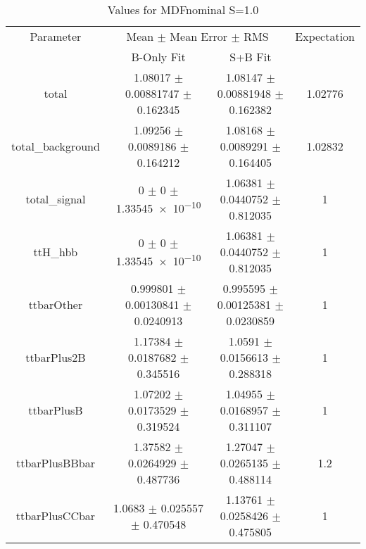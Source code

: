 \begin{table}
\centering
\caption{Values for MDFnominal S=1.0}
\begin{tabular}{cccc}
\toprule
Parameter & \multicolumn{2}{c}{Mean $\pm$ Mean Error $\pm$ RMS} & Expectation\\
 & B-Only Fit & S+B Fit & \\
\midrule
total & \num{1.08017} $\pm$ \num{0.00881747} $\pm$ \num{0.162345} & \num{1.08147} $\pm$ \num{0.00881948} $\pm$ \num{0.162382} & \num{1.02776}\\
total\_background & \num{1.09256} $\pm$ \num{0.0089186} $\pm$ \num{0.164212} & \num{1.08168} $\pm$ \num{0.0089291} $\pm$ \num{0.164405} & \num{1.02832}\\
total\_signal & \num{0} $\pm$ \num{0} $\pm$ \num{1.33545e-10} & \num{1.06381} $\pm$ \num{0.0440752} $\pm$ \num{0.812035} & \num{1}\\
ttH\_hbb & \num{0} $\pm$ \num{0} $\pm$ \num{1.33545e-10} & \num{1.06381} $\pm$ \num{0.0440752} $\pm$ \num{0.812035} & \num{1}\\
ttbarOther & \num{0.999801} $\pm$ \num{0.00130841} $\pm$ \num{0.0240913} & \num{0.995595} $\pm$ \num{0.00125381} $\pm$ \num{0.0230859} & \num{1}\\
ttbarPlus2B & \num{1.17384} $\pm$ \num{0.0187682} $\pm$ \num{0.345516} & \num{1.0591} $\pm$ \num{0.0156613} $\pm$ \num{0.288318} & \num{1}\\
ttbarPlusB & \num{1.07202} $\pm$ \num{0.0173529} $\pm$ \num{0.319524} & \num{1.04955} $\pm$ \num{0.0168957} $\pm$ \num{0.311107} & \num{1}\\
ttbarPlusBBbar & \num{1.37582} $\pm$ \num{0.0264929} $\pm$ \num{0.487736} & \num{1.27047} $\pm$ \num{0.0265135} $\pm$ \num{0.488114} & \num{1.2}\\
ttbarPlusCCbar & \num{1.0683} $\pm$ \num{0.025557} $\pm$ \num{0.470548} & \num{1.13761} $\pm$ \num{0.0258426} $\pm$ \num{0.475805} & \num{1}\\
\bottomrule
\end{tabular}
\end{table}